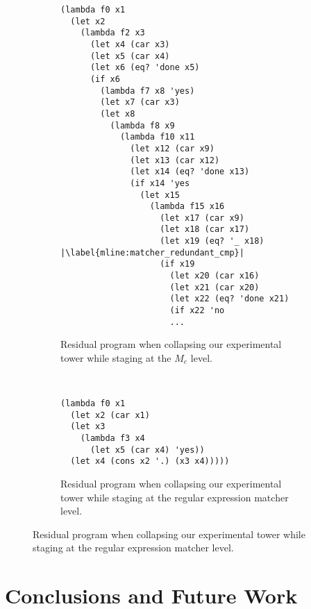 \documentclass[a4paper,12pt,twoside,openright]{report}
\theoremstyle{definition}
\newcommand{\mevl}{$M_{e}$}
\begin{document}
\begin{figure}[htp!]
\centering
    \begin{subfigure}{\linewidth}
        \centering
        \begin{verbatim}
(lambda f0 x1
  (let x2
    (lambda f2 x3
      (let x4 (car x3)
      (let x5 (car x4)
      (let x6 (eq? 'done x5)
      (if x6
        (lambda f7 x8 'yes)
        (let x7 (car x3)
        (let x8
          (lambda f8 x9
            (lambda f10 x11
              (let x12 (car x9)
              (let x13 (car x12)
              (let x14 (eq? 'done x13)
              (if x14 'yes
                (let x15
                  (lambda f15 x16
                    (let x17 (car x9)
                    (let x18 (car x17)
                    (let x19 (eq? '_ x18) |\label{mline:matcher_redundant_cmp}|
                    (if x19
                      (let x20 (car x16)
                      (let x21 (car x20)
                      (let x22 (eq? 'done x21)
                      (if x22 'no
                      ...
        \end{verbatim}
        \caption{Residual program when collapsing our experimental tower while staging at the \mevl{} level.}
        \label{lst:mevl_staged_regexp}
    \end{subfigure}
    \\[1ex]
    \par\bigskip
    \begin{subfigure}{\linewidth}
        \centering
        \begin{verbatim}
(lambda f0 x1
  (let x2 (car x1)
  (let x3
    (lambda f3 x4
      (let x5 (car x4) 'yes))
  (let x4 (cons x2 '.) (x3 x4)))))
        \end{verbatim}
        \caption{Residual program when collapsing our experimental tower while staging at the regular expression matcher level.}
        \label{lst:mevl_regexp_staged}
    \end{subfigure}
\end{figure}
\newpage

\section{Conclusions and Future Work}\label{sec:conclusion}
\end{document}
